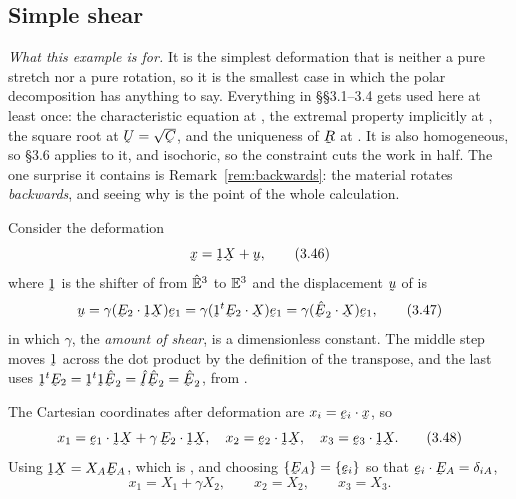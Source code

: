 \subsection{Simple shear}\label{sec:shear}

\emph{What this example is for.} It is the simplest deformation that is
neither a pure stretch nor a pure rotation, so it is the smallest case in
which the polar decomposition has anything to say. Everything in
\S\S3.1--3.4 gets used here at least once: the characteristic equation at
, the extremal property implicitly at , the square root at
$\bU=\sqrt{\bC}$, and the uniqueness of $\bR$ at . It is also
homogeneous, so \S3.6 applies to it, and isochoric, so the constraint
 cuts the work in half. The one surprise it contains is
Remark~\ref{rem:backwards}: the material rotates \emph{backwards}, and
seeing why is the point of the whole calculation.

Consider the deformation
\begin{equation}
   \bx=\shift\bX+\bu ,
   \tag{3.46}\label{eq:3.46}
\end{equation}
where $\shift$ is the shifter of  from $\hat{\mathbb{E}}^{3}$ to $\mathbb{E}^{3}$ and the
displacement $\bu$ of  is
\begin{equation}
   \bu=\gamma(\ip{\bE_{2}}{\shift\bX})\be_{1}
      =\gamma(\ip{\shift^{t}\bE_{2}}{\bX})\be_{1}
      =\gamma(\ip{\hbE_{2}}{\bX})\be_{1},
   \tag{3.47}\label{eq:3.47}
\end{equation}
in which $\gamma$, the \emph{amount of shear}, is a dimensionless
constant. The middle step moves $\shift$ across the dot product by the
definition of the transpose, and the last uses $\shift^{t}\bE_{2}
=\shift^{t}\shift\hbE_{2}=\hI\hbE_{2}=\hbE_{2}$, from .

The Cartesian coordinates after deformation are $x_{i}=\ip{\be_{i}}\bx$,
so
\begin{equation}
   x_{1}=\ip{\be_{1}}{\shift\bX}+\gamma\,\ip{\bE_{2}}{\shift\bX},\quad
   x_{2}=\ip{\be_{2}}{\shift\bX},\quad
   x_{3}=\ip{\be_{3}}{\shift\bX}.
   \tag{3.48}\label{eq:3.48}
\end{equation}
Using $\shift\bX=X_{A}\bE_{A}$, which is , and choosing
$\{\bE_{A}\}=\{\be_{i}\}$ so that $\ip{\be_{i}}{\bE_{A}}=\dd_{iA}$,
\begin{equation}
   x_{1}=X_{1}+\gamma X_{2},\qquad x_{2}=X_{2},\qquad x_{3}=X_{3}.
   \tag{3.49}\label{eq:3.49}
\end{equation}

